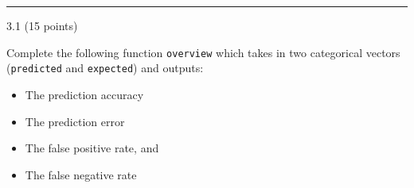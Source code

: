 \documentclass[
  letterpaper,
  DIV=11,
  numbers=noendperiod]{scrartcl}
\providecommand{\tightlist}{%
  \setlength{\itemsep}{0pt}\setlength{\parskip}{0pt}}\usepackage{longtable,booktabs,array}
\begin{document}
\begin{center}\rule{0.5\linewidth}{0.5pt}\end{center}

3.1 (15 points)

Complete the following function \texttt{overview} which takes in two
categorical vectors (\texttt{predicted} and \texttt{expected}) and
outputs:

\begin{itemize}
\tightlist
\item
  The prediction accuracy
\item
  The prediction error
\item
  The false positive rate, and
\item
  The false negative rate
\end{itemize}
\end{document}
